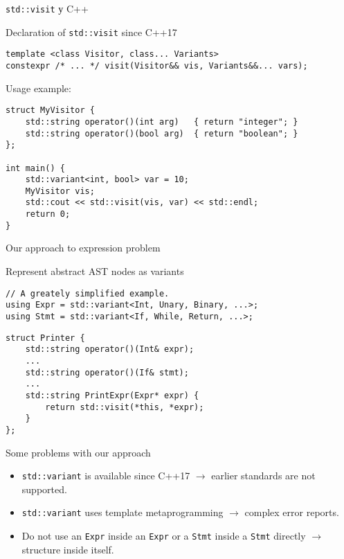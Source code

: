 \documentclass{beamer}
\begin{document}
    \begin{frame}[fragile]{\texttt{std::visit} у C++}
        \begin{block}{Declaration of \texttt{std::visit} since C++17}
\begin{verbatim}
template <class Visitor, class... Variants>
constexpr /* ... */ visit(Visitor&& vis, Variants&&... vars);
\end{verbatim}
        \end{block}

        \begin{center}
            Usage example:
        \end{center}
\begin{verbatim}
struct MyVisitor {
    std::string operator()(int arg)   { return "integer"; }
    std::string operator()(bool arg)  { return "boolean"; }
};

int main() {
    std::variant<int, bool> var = 10;
    MyVisitor vis;
    std::cout << std::visit(vis, var) << std::endl;
    return 0;
}
\end{verbatim}
    \end{frame}

    \begin{frame}[fragile]{Our approach to expression problem}
        \begin{block}{Represent abstract AST nodes as variants}
\begin{verbatim}
// A greately simplified example.
using Expr = std::variant<Int, Unary, Binary, ...>;
using Stmt = std::variant<If, While, Return, ...>;
\end{verbatim}
        \end{block}
\begin{verbatim}
struct Printer {
    std::string operator()(Int& expr);
    ...
    std::string operator()(If& stmt);
    ...
    std::string PrintExpr(Expr* expr) {
        return std::visit(*this, *expr);
    }
};
\end{verbatim}
    \end{frame}

    \begin{frame}{Some problems with our approach}
        \begin{itemize}
            \item \texttt{std::variant} is available since C++17 $\to$ earlier standards are not supported.
            \item \texttt{std::variant} uses template metaprogramming $\to$ complex error reports.
            \item Do not use an \texttt{Expr} inside an \texttt{Expr} or a \texttt{Stmt} inside a \texttt{Stmt} directly $\to$ structure inside itself.
        \end{itemize}
    \end{frame}
\end{document}
